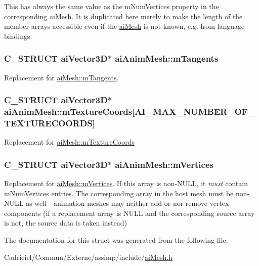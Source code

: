 This has always the same value as the m\-Num\-Vertices property in the corresponding \hyperlink{structai_mesh}{ai\-Mesh}. It is duplicated here merely to make the length of the member arrays accessible even if the \hyperlink{structai_mesh}{ai\-Mesh} is not known, e.\-g. from language bindings. \hypertarget{structai_anim_mesh_a95dcc49c6d5ecc570ceb54552a0a9625}{
\subsubsection[{m\-Tangents}]{\setlength{\rightskip}{0pt plus 5cm}C\-\_\-\-S\-T\-R\-U\-C\-T {\bf ai\-Vector3\-D}$\ast$ ai\-Anim\-Mesh\-::m\-Tangents}}\label{structai_anim_mesh_a95dcc49c6d5ecc570ceb54552a0a9625}
Replacement for \hyperlink{structai_mesh_af367ff78bd69f3e83d7edc8ad67dc5df}{ai\-Mesh\-::m\-Tangents}. \hypertarget{structai_anim_mesh_ad24a0451adeb845a53eb2351b9462e0a}{
\subsubsection[{m\-Texture\-Coords}]{\setlength{\rightskip}{0pt plus 5cm}C\-\_\-\-S\-T\-R\-U\-C\-T {\bf ai\-Vector3\-D}$\ast$ ai\-Anim\-Mesh\-::m\-Texture\-Coords\mbox{[}{\bf A\-I\-\_\-\-M\-A\-X\-\_\-\-N\-U\-M\-B\-E\-R\-\_\-\-O\-F\-\_\-\-T\-E\-X\-T\-U\-R\-E\-C\-O\-O\-R\-D\-S}\mbox{]}}}\label{structai_anim_mesh_ad24a0451adeb845a53eb2351b9462e0a}
Replacement for \hyperlink{structai_mesh_a4a50b11d00ef50f419c75cab0f6bddd6}{ai\-Mesh\-::m\-Texture\-Coords} \hypertarget{structai_anim_mesh_a0ac2dd4c1afd23e6a9293b1d0ded3060}{
\subsubsection[{m\-Vertices}]{\setlength{\rightskip}{0pt plus 5cm}C\-\_\-\-S\-T\-R\-U\-C\-T {\bf ai\-Vector3\-D}$\ast$ ai\-Anim\-Mesh\-::m\-Vertices}}\label{structai_anim_mesh_a0ac2dd4c1afd23e6a9293b1d0ded3060}
Replacement for \hyperlink{structai_mesh_afd4588abb3e1c72821ae0234a3850662}{ai\-Mesh\-::m\-Vertices}. If this array is non-\/\-N\-U\-L\-L, it {\itshape must} contain m\-Num\-Vertices entries. The corresponding array in the host mesh must be non-\/\-N\-U\-L\-L as well -\/ animation meshes may neither add or nor remove vertex components (if a replacement array is N\-U\-L\-L and the corresponding source array is not, the source data is taken instead) 

The documentation for this struct was generated from the following file\-:\begin{DoxyCompactItemize}
\item 
Cadriciel/\-Commun/\-Externe/assimp/include/\hyperlink{ai_mesh_8h}{ai\-Mesh.\-h}\end{DoxyCompactItemize}
